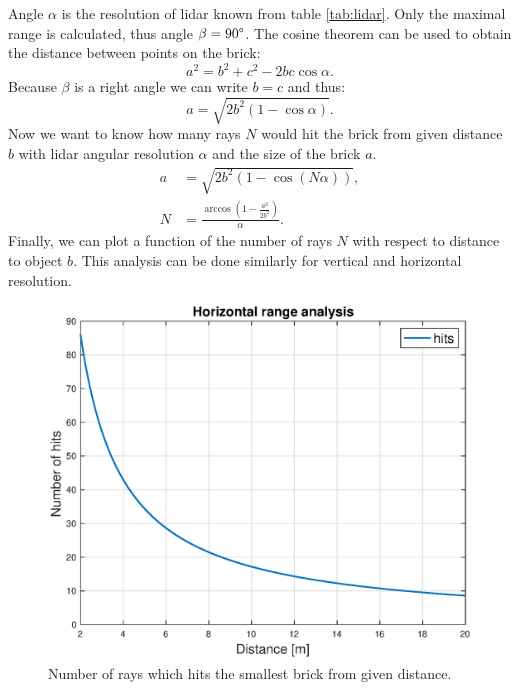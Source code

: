 Angle $\alpha$ is the resolution of lidar known from table \ref{tab:lidar}. Only the maximal range is calculated, thus angle $\beta = 90\degree$. The cosine theorem can be used to obtain the distance between points on the brick:
\begin{equation}
a^2 = b^2 + c^2 - 2bc \cos \alpha.
\end{equation}
Because $\beta$ is a right angle we can write $b = c$ and thus:
\begin{equation}
a = \sqrt{2b^2 \left(1-\cos \alpha \right)}.
\end{equation}
Now we want to know how many rays $N$ would hit the brick from given distance $b$ with lidar angular resolution $\alpha$ and the size of the brick $a$. 
\begin{align}
a &= \sqrt{2b^2 \left(1-\cos \left( N \alpha \right) \right)}, \\
N &= \frac{\arccos\left(1-\frac{a^2}{2b^2}\right) }{\alpha}.
\label{eq:rays}
\end{align}
Finally, we can plot a function of the number of rays $N$ with respect to distance to object $b$. This analysis can be done similarly for vertical and horizontal resolution.

\begin{figure}[H]
	\centering
	\includegraphics[scale=0.55]{fig/horizontal_range.eps}
	\caption[Horizontal range chart]{Number of rays which hits the smallest brick from given distance.}
	\label{fig:horizontal_hits}
\end{figure}


